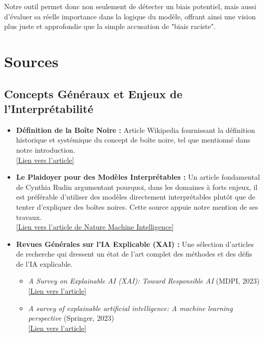 \documentclass{article}
\begin{document}
Notre outil permet donc non seulement de détecter un biais potentiel, mais aussi d'évaluer sa réelle importance dans la logique du modèle, offrant ainsi une vision plus juste et approfondie que la simple accusation de "biais raciste".

\clearpage

\section{Sources}

\subsection*{Concepts Généraux et Enjeux de l'Interprétabilité}

\begin{itemize}
    \item \textbf{Définition de la Boîte Noire :} Article Wikipedia fournissant la définition historique et systémique du concept de boîte noire, tel que mentionné dans notre introduction. \\
    \href{https://fr.wikipedia.org/wiki/Boîte_noire_(système)}{[Lien vers l'article]}

    \item \textbf{Le Plaidoyer pour des Modèles Interprétables :} Un article fondamental de Cynthia Rudin argumentant pourquoi, dans les domaines à forts enjeux, il est préférable d'utiliser des modèles directement interprétables plutôt que de tenter d'expliquer des boîtes noires. Cette source appuie notre mention de ses travaux. \\
    \href{https://www.nature.com/articles/s42256-019-0133-z}{[Lien vers l'article de Nature Machine Intelligence]}

    \item \textbf{Revues Générales sur l'IA Explicable (XAI) :} Une sélection d'articles de recherche qui dressent un état de l'art complet des méthodes et des défis de l'IA explicable.
    \begin{itemize}
        \item \textit{A Survey on Explainable AI (XAI): Toward Responsible AI} (MDPI, 2023) \\
        \href{https://www.mdpi.com/2078-2489/14/8/426}{[Lien vers l'article]}
        \item \textit{A survey of explainable artificial intelligence: A machine learning perspective} (Springer, 2023) \\
        \href{https://link.springer.com/article/10.1007/s12559-023-10179-8}{[Lien vers l'article]}
    \end{itemize}
\end{itemize}
\end{document}
